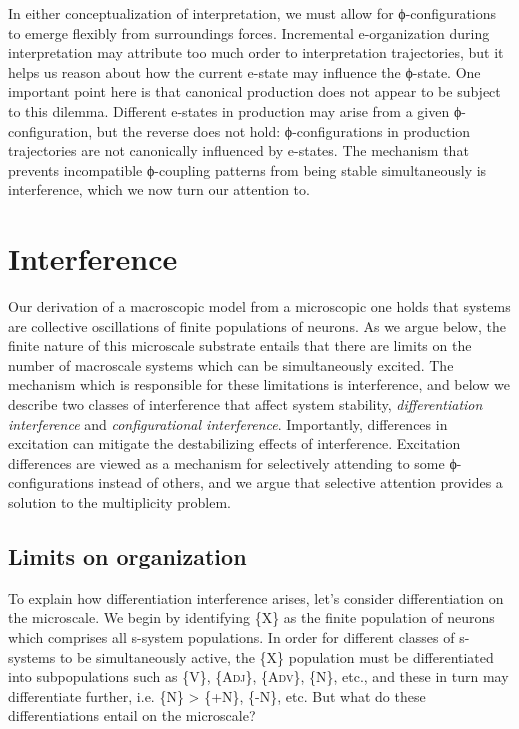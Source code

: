   In either conceptualization of interpretation, we must allow for ϕ-configurations to emerge flexibly from surroundings forces. Incremental e-organization during interpretation may attribute too much order to interpretation trajectories, but it helps us reason about how the current e-state may influence the ϕ-state. One important point here is that canonical production does not appear to be subject to this dilemma. Different e-states in production may arise from a given ϕ-configuration, but the reverse does not hold: ϕ-configurations in production trajectories are not canonically influenced by e-states. The mechanism that prevents incompatible ϕ-coupling patterns from being stable simultaneously is interference, which we now turn our attention to.

\section{Interference}

Our derivation of a macroscopic model from a microscopic one holds that systems are collective oscillations of finite populations of neurons. As we argue below, the finite nature of this microscale substrate entails that there are limits on the number of macroscale systems which can be simultaneously excited. The mechanism which is responsible for these limitations is interference, and below we describe two classes of interference that affect system stability, \textit{differentiation interference} and \textit{configurational interference}. Importantly, differences in excitation can mitigate the destabilizing effects of interference. Excitation differences are viewed as a mechanism for selectively attending to some ϕ-configurations instead of others, and we argue that selective attention provides a solution to the multiplicity problem.

\subsection{Limits on organization}

To explain how differentiation interference arises, let's consider differentiation on the microscale. We begin by identifying \{X\} as the finite population of neurons which comprises all s-system populations. In order for different classes of s-systems to be simultaneously active, the \{X\} population must be differentiated into subpopulations such as \{V\}, \{A\textsc{dj}\}, \{A\textsc{dv}\}, \{N\}, etc., and these in turn may differentiate further, i.e. \{N\} > \{+N\}, \{-N\}, etc. But what do these differentiations entail on the microscale?


